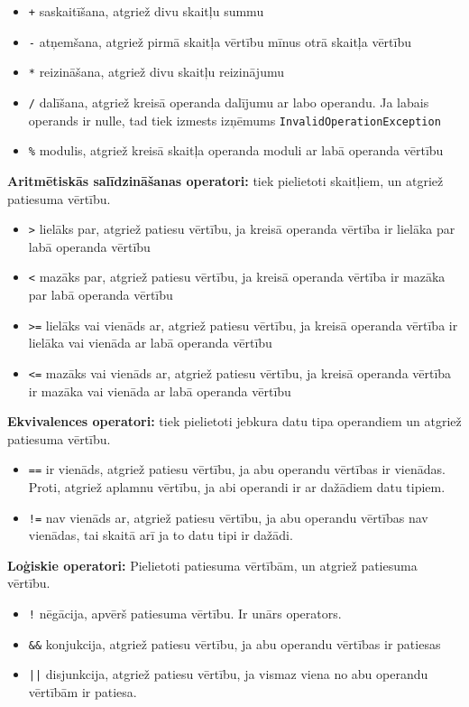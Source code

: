 \documentclass[12pt,a4paper]{report}
\begin{document}
\begin{itemize}
  \item \texttt{+} saskaitīšana, atgriež divu skaitļu summu
  \item \texttt{-} atņemšana, atgriež pirmā skaitļa vērtību mīnus otrā skaitļa vērtību
  \item \texttt{*} reizināšana, atgriež divu skaitļu reizinājumu
  \item \texttt{/} dalīšana, atgriež kreisā operanda dalījumu ar labo operandu. Ja labais operands ir nulle, tad tiek izmests izņēmums \texttt{InvalidOperationException}
  \item \texttt{\%} modulis, atgriež kreisā skaitļa operanda moduli ar labā operanda vērtību
\end{itemize}

\textbf{Aritmētiskās salīdzināšanas operatori:} tiek pielietoti skaitļiem, un atgriež patiesuma vērtību. 
\begin{itemize}
  \item \texttt{>} lielāks par, atgriež patiesu vērtību, ja kreisā operanda vērtība ir lielāka par labā operanda vērtību
  \item \texttt{<} mazāks par, atgriež patiesu vērtību, ja kreisā operanda vērtība ir mazāka par labā operanda vērtību
  \item \texttt{>=} lielāks vai vienāds ar, atgriež patiesu vērtību, ja kreisā operanda vērtība ir lielāka vai vienāda ar labā operanda vērtību
  \item \texttt{<=} mazāks vai vienāds ar, atgriež patiesu vērtību, ja kreisā operanda vērtība ir mazāka vai vienāda ar labā operanda vērtību
\end{itemize}

\textbf{Ekvivalences operatori:} tiek pielietoti jebkura datu tipa operandiem un atgriež patiesuma vērtību. 
\begin{itemize}
  \item \texttt{==} ir vienāds, atgriež patiesu vērtību, ja abu operandu vērtības ir vienādas. Proti, atgriež aplamnu vērtību, ja abi operandi ir ar dažādiem datu tipiem.
  \item \texttt{!=} nav vienāds ar, atgriež patiesu vērtību, ja abu operandu vērtības nav vienādas, tai skaitā arī ja to datu tipi ir dažādi.
\end{itemize}

\textbf{Loģiskie operatori:} Pielietoti patiesuma vērtībām, un atgriež patiesuma vērtību.
\begin{itemize}
  \item \texttt{!} nēgācija, apvērš patiesuma vērtību. Ir unārs operators. 
  \item \texttt{\&\&} konjukcija, atgriež patiesu vērtību, ja abu operandu vērtības ir patiesas
  \item \texttt{||} disjunkcija, atgriež patiesu vērtību, ja vismaz viena no abu operandu vērtībām ir patiesa.
\end{itemize}
\end{document}
